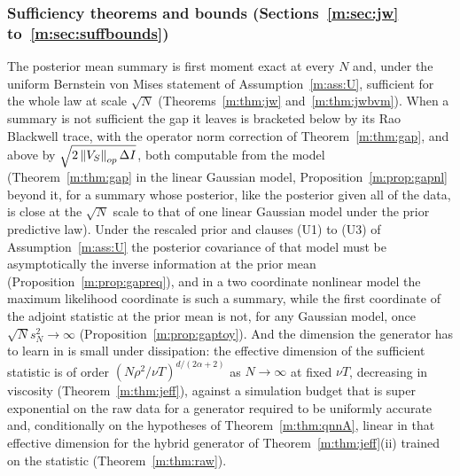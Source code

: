 \subsubsection{Sufficiency theorems and bounds (Sections~\ref{m:sec:jw} to~\ref{m:sec:suffbounds})} The posterior mean summary is first moment exact at every $N$ and, under the uniform Bernstein von Mises statement of Assumption~\ref{m:ass:U}, sufficient for the whole law at scale $\sqrt N$ (Theorems~\ref{m:thm:jw} and~\ref{m:thm:jwbvm}). When a summary is not sufficient the gap it leaves is bracketed below by its Rao Blackwell trace, with the operator norm correction of Theorem~\ref{m:thm:gap}, and above by $\sqrt{2\left\|V_S\right\|_{op}\Delta I}$, both computable from the model (Theorem~\ref{m:thm:gap} in the linear Gaussian model, Proposition~\ref{m:prop:gapnl} beyond it, for a summary whose posterior, like the posterior given all of the data, is close at the $\sqrt N$ scale to that of one linear Gaussian model under the prior predictive law). Under the rescaled prior and clauses (U1) to (U3) of Assumption~\ref{m:ass:U} the posterior covariance of that model must be asymptotically the inverse information at the prior mean (Proposition~\ref{m:prop:gapreq}), and in a two coordinate nonlinear model the maximum likelihood coordinate is such a summary, while the first coordinate of the adjoint statistic at the prior mean is not, for any Gaussian model, once $\sqrt Ns_N^2\to\infty$ (Proposition~\ref{m:prop:gaptoy}). And the dimension the generator has to learn in is small under dissipation: the effective dimension of the sufficient statistic is of order $(N\rho^2/\nu T)^{d/(2\alpha+2)}$ as $N\to\infty$ at fixed $\nu T$, decreasing in viscosity (Theorem~\ref{m:thm:jeff}), against a simulation budget that is super exponential on the raw data for a generator required to be uniformly accurate and, conditionally on the hypotheses of Theorem~\ref{m:thm:qnnA}, linear in that effective dimension for the hybrid generator of Theorem~\ref{m:thm:jeff}(ii) trained on the statistic (Theorem~\ref{m:thm:raw}).

